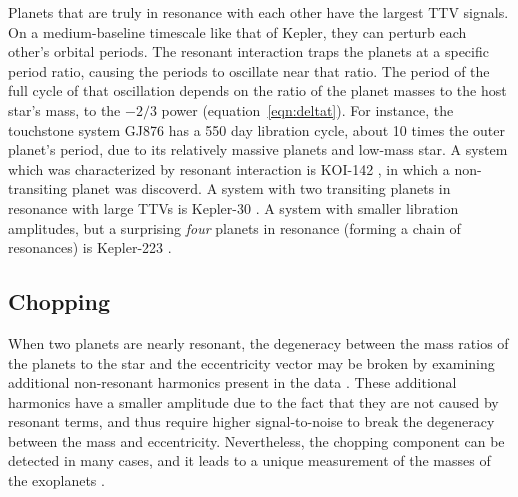 \documentclass[graybox,natbib,nosecnum]{svmult}
\begin{document}
Planets that are truly in resonance with each other have the largest TTV signals.  On a medium-baseline timescale like that of Kepler, they can perturb each other's orbital periods.  The resonant interaction traps the planets at a specific period ratio, causing the periods to oscillate near that ratio.  The period of the full cycle of that oscillation depends on the ratio of the planet masses to the host star's mass, to the $-2/3$ power (equation~\ref{eqn:deltat}).  For instance, the touchstone system GJ876 has a 550 day libration cycle, about 10 times the outer planet's period, due to its relatively massive planets and low-mass star.  A system which was characterized by resonant interaction is KOI-142 \citep{2013ApJ...777....3N}, in which a non-transiting planet was discoverd.   A system with two transiting planets in resonance with large TTVs is Kepler-30 \citep{2012ApJ...750..114F}.  A system with smaller libration amplitudes, but a surprising \emph{four} planets in resonance (forming a chain of resonances) is Kepler-223 \citep{2016Natur.533..509M}.


\subsection{Chopping}

When two planets are nearly resonant, the degeneracy between the mass ratios of the planets to the star
and the eccentricity vector may be broken by examining additional non-resonant harmonics present in the data \citep{2015ApJ...802..116D}.
These additional harmonics have a smaller amplitude due to the fact that they are not caused by resonant terms,
and thus require higher signal-to-noise to break the degeneracy between the mass and eccentricity.
Nevertheless, the chopping component can be detected in many cases, and it leads to a unique measurement
of the masses of the exoplanets \citep{2014ApJ...790...58N,2014ApJ...795..167S,2015ApJ...802..116D}.
\end{document}
